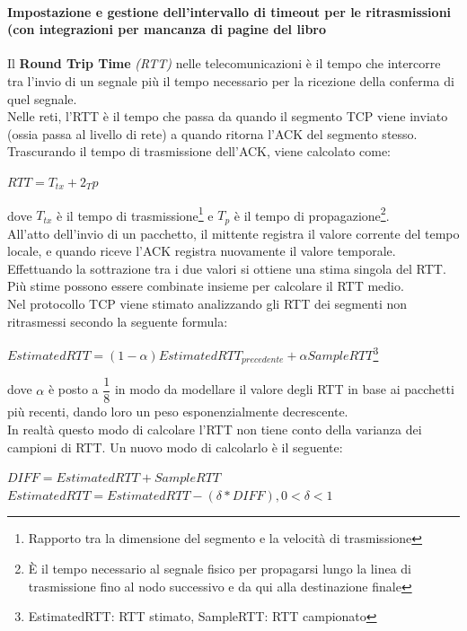 \documentclass[11pt,a4paper]{article}
\begin{document}
\paragraph{Impostazione e gestione dell'intervallo di timeout per le ritrasmissioni (con integrazioni per mancanza di pagine del libro}
Il \textbf{Round Trip Time} \textit{(RTT)} nelle telecomunicazioni è il tempo che intercorre tra l'invio di un segnale più il tempo necessario per la ricezione della conferma di quel segnale. \\
Nelle reti, l'RTT è il tempo che passa da quando il segmento TCP viene inviato (ossia passa al livello di rete) a quando ritorna l'ACK del segmento stesso. Trascurando il tempo di trasmissione dell'ACK, viene calcolato come:
\begin{center}
	$RTT = T_{tx} + 2_T{p}$
\end{center}
dove $T_{tx}$ è il tempo di trasmissione\footnote{Rapporto tra la dimensione del segmento e la velocità di trasmissione} e $T_{p}$ è il tempo di propagazione\footnote{È il tempo necessario al segnale fisico per propagarsi lungo la linea di trasmissione fino al nodo successivo e da qui alla destinazione finale}. \\
All'atto dell'invio di un pacchetto, il mittente registra il valore corrente del tempo locale, e quando riceve l'ACK registra nuovamente il valore temporale. Effettuando la sottrazione tra i due valori si ottiene una stima singola del RTT. Più stime possono essere combinate insieme per calcolare il RTT medio. \\
Nel protocollo TCP viene stimato analizzando gli RTT dei segmenti non ritrasmessi secondo la seguente formula:
\begin{center}
	$EstimatedRTT = (1-\alpha )EstimatedRTT_{precedente} + \alpha SampleRTT$\footnote{EstimatedRTT: RTT stimato, SampleRTT: RTT campionato}
\end{center}
dove $\alpha$ è posto a $\dfrac{1}{8}$ in modo da modellare il valore degli RTT in base ai pacchetti più recenti, dando loro un peso esponenzialmente decrescente. \\
In realtà questo modo di calcolare l'RTT non tiene conto della varianza dei campioni di RTT. Un nuovo modo di calcolarlo è il seguente:
\begin{center}
	$DIFF = EstimatedRTT + SampleRTT$
	$EstimatedRTT = EstimatedRTT - (\delta*DIFF), 0 < \delta < 1$
\end{center}
\end{document}
